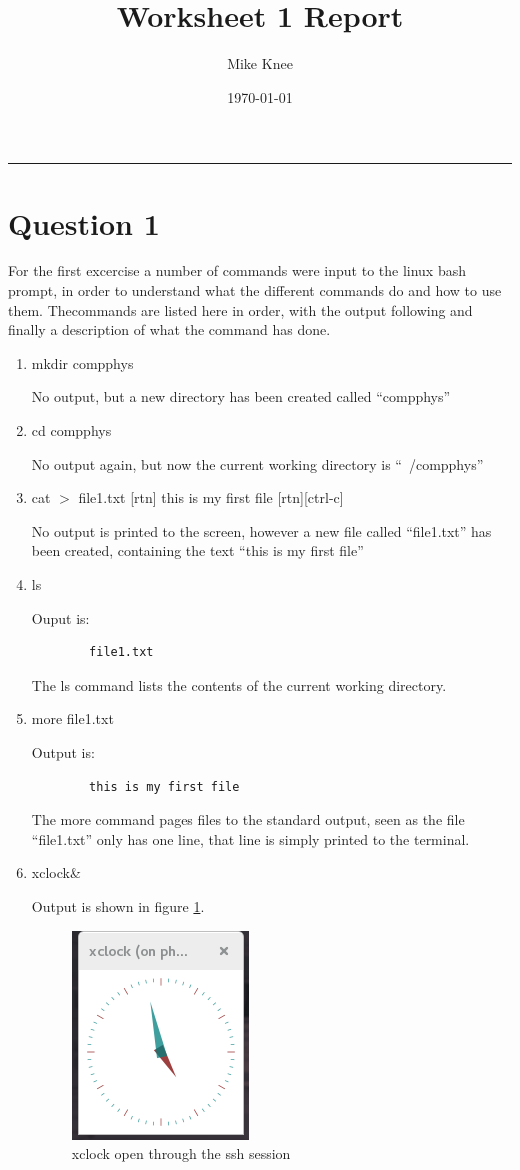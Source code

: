 \documentclass[a4paper,12pt]{UoBnote}
\author{Mike Knee}
\title{Worksheet 1 Report}
\date{\today}
\begin{document}
\maketitle
\tableofcontents
\vspace{1cm}\hrule \vspace{1cm}

\section{Question 1}

For the first excercise a number of commands were input to the linux bash prompt, in order to understand what the different commands do and how to use them. Thecommands are listed here in order, with the output following and finally a description of what the command has done.
\begin{enumerate}[label=\alph*)]
	\item mkdir compphys

		No output, but a new directory has been created called ``compphys''
	\item cd compphys

		No output again, but now the current working directory is ``~/compphys''
	\item cat $>$ file1.txt [rtn] this is my first file [rtn][ctrl-c]

		No output is printed to the screen, however a new file called ``file1.txt'' has been created, containing the text ``this is my first file''
	\item ls

		Ouput is: 
		\begin{verbatim}
		file1.txt
		\end{verbatim}

		The ls command lists the contents of the current working directory.
	\item more file1.txt

		Output is:
		\begin{verbatim}
		this is my first file
		\end{verbatim}

		The more command pages files to the standard output, seen as the file ``file1.txt'' only has one line, that line is simply printed to the terminal.
	\item xclock\&

		Output is shown in figure \ref{fig:xclock}.
		\begin{figure}
			\centering
			\includegraphics{xclock}
			\caption{xclock open through the ssh session}
			\label{fig:xclock}
		\end{figure}


\end{enumerate}
\end{document}

